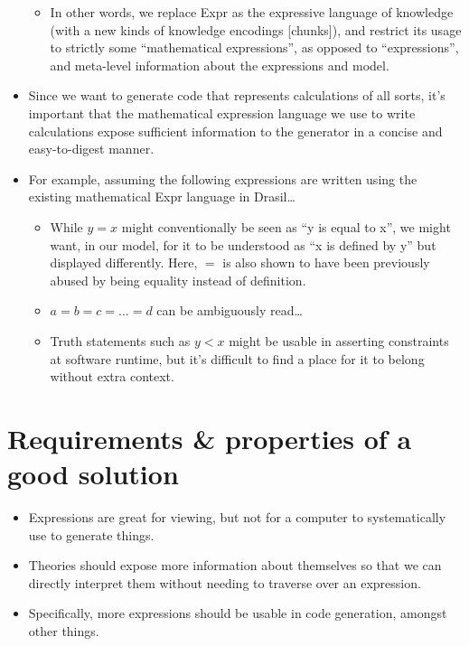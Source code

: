 \begin{itemize}
\begin{itemize}
		      \item In other words, we replace Expr as the expressive language
		            of knowledge (with a new kinds of knowledge encodings
		            [chunks]), and restrict its usage to strictly some
		            ``mathematical expressions'', as opposed to ``expressions'',
		            and meta-level information about the expressions and model.

	      \end{itemize}

	\item Since we want to generate code that represents calculations of all
	      sorts, it's important that the mathematical expression language we use
	      to write calculations expose sufficient information to the generator
	      in a concise and easy-to-digest manner.

	\item For example, assuming the following expressions are written using the
	      existing mathematical Expr language in Drasil\ldots{}
	      \begin{itemize}

		      \item While \(y = x\) might conventionally be seen as ``y is equal
		            to x'', we might want, in our model, for it to be understood
		            as ``x is defined by y'' but displayed differently. Here,
		            \(=\) is also shown to have been previously abused by being
		            equality instead of definition.

		      \item \(a = b = c = ... = d\) can be ambiguously read\ldots{}

		      \item Truth statements such as \(y < x\) might be usable in
		            asserting constraints at software runtime, but it's
		            difficult to find a place for it to belong without extra
		            context.

	      \end{itemize}

\end{itemize}

\section{Requirements \& properties of a good solution}

\begin{itemize}

	\item Expressions are great for viewing, but not for a computer to
	      systematically use to generate things.

	\item Theories should expose more information about themselves so that we
	      can directly interpret them without needing to traverse over an
	      expression.

	\item Specifically, more expressions should be usable in code generation,
	      amongst other things.

\end{itemize}

